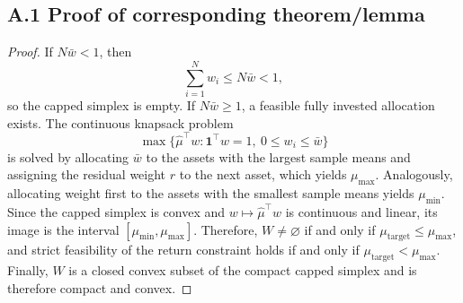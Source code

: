 \documentclass[smallextended]{svjour3}
\begin{document}
\subsection*{A.1 Proof of corresponding theorem/lemma}
\begin{proof}
If $N\bar w<1$, then
\begin{equation}
\sum_{i=1}^{N}w_i\leq N\bar w<1,
\end{equation}
so the capped simplex is empty. If $N\bar w\geq1$, a feasible fully invested allocation exists. The continuous knapsack problem
\begin{equation}
\max\{\hat\mu^\top w:\mathbf 1^\top w=1,\ 0\leq w_i\leq\bar w\}
\end{equation}
is solved by allocating $\bar w$ to the assets with the largest sample means and assigning the residual weight $r$ to the next asset, which yields $\mu_{\max}$. Analogously, allocating weight first to the assets with the smallest sample means yields $\mu_{\min}$. Since the capped simplex is convex and $w\mapsto\hat\mu^\top w$ is continuous and linear, its image is the interval $[\mu_{\min},\mu_{\max}]$. Therefore, $W\neq\varnothing$ if and only if $\mu_{\mathrm{target}}\leq\mu_{\max}$, and strict feasibility of the return constraint holds if and only if $\mu_{\mathrm{target}}<\mu_{\max}$. Finally, $W$ is a closed convex subset of the compact capped simplex and is therefore compact and convex.
\end{proof}
\end{document}
